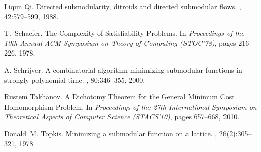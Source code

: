\documentclass[11pt,onecolumn]{article}
\begin{document}
\begin{thebibliography}{10}
Liqun Qi.
\newblock Directed submodularity, ditroids and directed submodular flows.
, 42:579--599, 1988.

T.~Schaefer.
\newblock The {C}omplexity of {S}atisfiability {P}roblems.
\newblock In {\em Proceedings
  of the 10th {A}nnual {A}{C}{M} {S}ymposium on {T}heory of {C}omputing
  ({S}{T}{O}{C}'78)}, pages 216--226, 1978.

A. Schrijver.
\newblock A combinatorial algorithm minimizing submodular functions in strongly polynomial time.
, 80:346--355, 2000.

Rustem Takhanov.
\newblock A {D}ichotomy {T}heorem for the {G}eneral {M}inimum {C}ost
  {H}omomorphism {P}roblem.
\newblock In {\em Proceedings of the 27th International Symposium on
  Theoretical Aspects of Computer Science (STACS'10)}, pages 657--668, 2010.

Donald~M. Topkis.
\newblock Minimizing a submodular function on a lattice.
, 26(2):305--321, 1978.





























\end{thebibliography}
\end{document}
